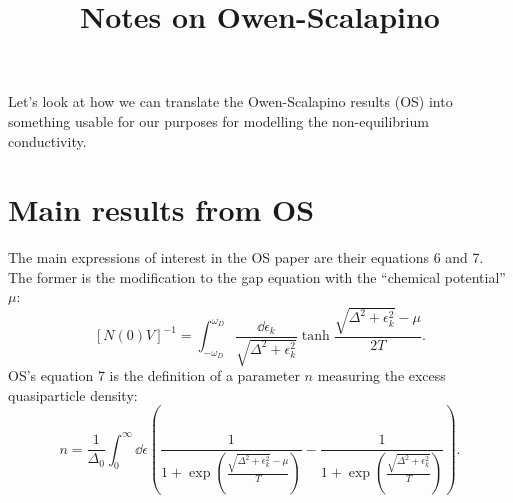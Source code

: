 \documentclass{article}
\title{Notes on Owen-Scalapino}
\newcommand{\corr}{\mu}
\begin{document}
\maketitle

Let's look at how we can translate the Owen-Scalapino results (OS)\cite{OwenScalapino} into something usable for our purposes for modelling the non-equilibrium conductivity.

\section{Main results from OS} \label{sec:intro}

The main expressions of interest in the OS paper are their equations 6 and 7.
The former is the modification to the gap equation with the ``chemical potential'' $\corr$:
\begin{equation}
	\left[ N(0) V \right]^{-1} = \int_{- \omega_D}^{\omega_D} \frac{\dd{\epsilon_k}}{\sqrt{\Delta^2 + \epsilon_k^2}} \tanh{\frac{\sqrt{\Delta^2 + \epsilon_k^2} - \corr}{2 T}}. \label{eq:gap}
\end{equation}
OS's equation 7 is the definition of a parameter $n$ measuring the excess quasiparticle density:
\begin{equation}
	n = \frac{1}{\Delta_0} \int_0^\infty \dd{\epsilon} \left( \frac{1}{1 + \exp(\frac{\sqrt{\Delta^2 + \epsilon_k^2} - \corr}{T})} - \frac{1}{1 + \exp(\frac{\sqrt{\Delta^2 + \epsilon_k^2}}{T})} \right). \label{eq:n}
\end{equation}
\end{document}
